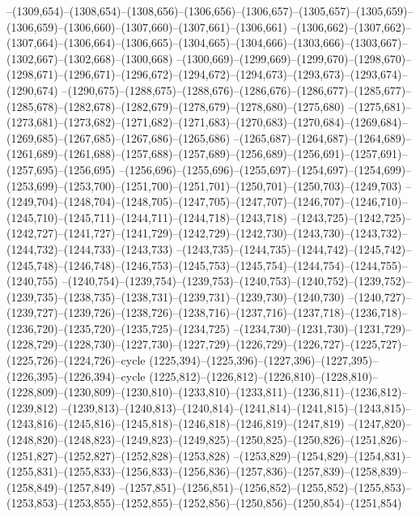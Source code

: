 --(1309,654)--(1308,654)--(1308,656)--(1306,656)--(1306,657)--(1305,657)--(1305,659)--(1306,659)--(1306,660)--(1307,660)--(1307,661)--(1306,661)
--(1306,662)--(1307,662)--(1307,664)--(1306,664)--(1306,665)--(1304,665)--(1304,666)--(1303,666)--(1303,667)--(1302,667)--(1302,668)--(1300,668)
--(1300,669)--(1299,669)--(1299,670)--(1298,670)--(1298,671)--(1296,671)--(1296,672)--(1294,672)--(1294,673)--(1293,673)--(1293,674)--(1290,674)
--(1290,675)--(1288,675)--(1288,676)--(1286,676)--(1286,677)--(1285,677)--(1285,678)--(1282,678)--(1282,679)--(1278,679)--(1278,680)--(1275,680)
--(1275,681)--(1273,681)--(1273,682)--(1271,682)--(1271,683)--(1270,683)--(1270,684)--(1269,684)--(1269,685)--(1267,685)--(1267,686)--(1265,686)
--(1265,687)--(1264,687)--(1264,689)--(1261,689)--(1261,688)--(1257,688)--(1257,689)--(1256,689)--(1256,691)--(1257,691)--(1257,695)--(1256,695)
--(1256,696)--(1255,696)--(1255,697)--(1254,697)--(1254,699)--(1253,699)--(1253,700)--(1251,700)--(1251,701)--(1250,701)--(1250,703)--(1249,703)
--(1249,704)--(1248,704)--(1248,705)--(1247,705)--(1247,707)--(1246,707)--(1246,710)--(1245,710)--(1245,711)--(1244,711)--(1244,718)--(1243,718)
--(1243,725)--(1242,725)--(1242,727)--(1241,727)--(1241,729)--(1242,729)--(1242,730)--(1243,730)--(1243,732)--(1244,732)--(1244,733)--(1243,733)
--(1243,735)--(1244,735)--(1244,742)--(1245,742)--(1245,748)--(1246,748)--(1246,753)--(1245,753)--(1245,754)--(1244,754)--(1244,755)--(1240,755)
--(1240,754)--(1239,754)--(1239,753)--(1240,753)--(1240,752)--(1239,752)--(1239,735)--(1238,735)--(1238,731)--(1239,731)--(1239,730)--(1240,730)
--(1240,727)--(1239,727)--(1239,726)--(1238,726)--(1238,716)--(1237,716)--(1237,718)--(1236,718)--(1236,720)--(1235,720)--(1235,725)--(1234,725)
--(1234,730)--(1231,730)--(1231,729)--(1228,729)--(1228,730)--(1227,730)--(1227,729)--(1226,729)--(1226,727)--(1225,727)--(1225,726)--(1224,726)--cycle
(1225,394)--(1225,396)--(1227,396)--(1227,395)--(1226,395)--(1226,394)--cycle
(1225,812)--(1226,812)--(1226,810)--(1228,810)--(1228,809)--(1230,809)--(1230,810)--(1233,810)--(1233,811)--(1236,811)--(1236,812)--(1239,812)
--(1239,813)--(1240,813)--(1240,814)--(1241,814)--(1241,815)--(1243,815)--(1243,816)--(1245,816)--(1245,818)--(1246,818)--(1246,819)--(1247,819)
--(1247,820)--(1248,820)--(1248,823)--(1249,823)--(1249,825)--(1250,825)--(1250,826)--(1251,826)--(1251,827)--(1252,827)--(1252,828)--(1253,828)
--(1253,829)--(1254,829)--(1254,831)--(1255,831)--(1255,833)--(1256,833)--(1256,836)--(1257,836)--(1257,839)--(1258,839)--(1258,849)--(1257,849)
--(1257,851)--(1256,851)--(1256,852)--(1255,852)--(1255,853)--(1253,853)--(1253,855)--(1252,855)--(1252,856)--(1250,856)--(1250,854)--(1251,854)
